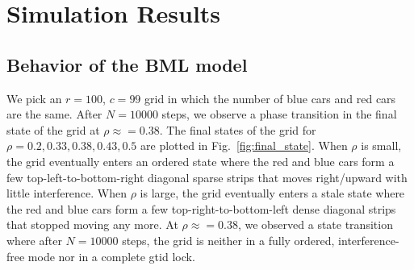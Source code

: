 \documentclass[twocolumn]{article}
\begin{document}
\section{Simulation Results}
\subsection{Behavior of the BML model}
We pick an $r=100$, $c=99$ grid in which the number of blue cars and red cars
are the same. After $N = 10000$ steps, we observe a phase transition in the
final state of the grid at $\rho\approx= 0.38$. The final states of the grid for
$\rho = 0.2, 0.33, 0.38, 0.43, 0.5$ are plotted in Fig.~\ref{fig:final_state}.
When $\rho$ is small, the grid eventually enters an ordered state where the red
and blue cars form a few top-left-to-bottom-right diagonal sparse strips that
moves right/upward with little interference. When $\rho$ is large, the grid eventually
enters a stale state where the red and blue cars form a few
top-right-to-bottom-left dense diagonal strips that stopped moving any more. At
$\rho\approx= 0.38$, we observed a state transition where after $N = 10000$
steps, the grid is neither in a fully ordered, interference-free mode nor in a
complete gtid lock.
\end{document}
